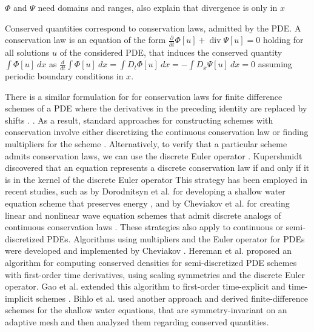 \documentclass[runningheads]{llncs}
\renewcommand{\div}{\operatorname{div}}
\newcommand{\1}{\chi}
\begin{document}
{\color{red} $\Phi$ and $\Psi$ need domains and ranges, also explain that divergence is only in $x$}

Conserved quantities correspond to conservation laws, admitted by the PDE. A conservation law \cite{cheviakov20} is an equation of the form
$
	\frac{\partial }{\partial t}\Phi[u]+\div \Psi[u]=0
$
holding for all solutions $u$ of the considered PDE,
that induces the conserved quantity $\int \Phi[u]\ dx$ as
$
	\frac{d}{dt}\int \Phi[u]\ dx=\int D_t\Phi[u]\ dx=-\int D_x\Psi[u]\ dx=0
$
assuming periodic boundary conditions in $x$.

There is a similar formulation for
for conservation laws for finite difference schemes of a PDE  where the derivatives in the preceding identity are replaced by shifts \cite{hydon01}.  . As a result, standard approaches for constructing schemes with conservation involve either discretizing the continuous conservation law or finding multipliers for the scheme \cite{dorodnitsyn21}.
Alternatively, 
to verify that a particular scheme admits conservation laws, we can use the  discrete Euler operator \cite{cheviakov20}. Kupershmidt \cite[II. Theorem 31]{kupershmidt85} discovered that an equation represents a discrete conservation law if and only if it is in the kernel of the discrete Euler operator
This strategy has been employed in recent studies, such as by Dorodnitsyn et al. for developing a shallow water equation scheme that preserves energy \cite{dorodnitsyn21}, and by Cheviakov et al. for creating linear and nonlinear wave equation schemes that admit discrete analogs of continuous conservation laws \cite{cheviakov20}.
These strategies also apply to continuous or semi-discretized PDEs. Algorithms using multipliers and the Euler operator for PDEs were developed and implemented by Cheviakov \cite{cheviakov07,cheviakov10}. Hereman et al. \cite{hereman04,hereman08} proposed an algorithm for computing conserved densities for semi-discretized PDE schemes with first-order time derivatives, using scaling symmetries and the discrete Euler operator. Gao et al. extended this algorithm to first-order time-explicit \cite{gao02} and time-implicit schemes \cite{gao04}.
Bihlo et al. \cite{bihlo12} used another approach and derived finite-difference schemes for the shallow water equations, that are symmetry-invariant on an adaptive mesh and then analyzed them regarding conserved quantities.
\end{document}
